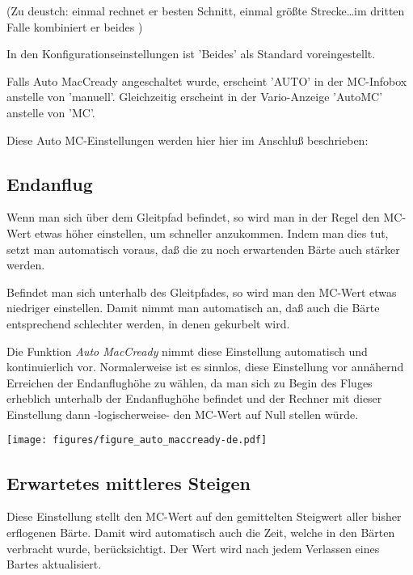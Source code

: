 (Zu deustch: einmal rechnet er besten Schnitt, einmal größte Strecke\dots im
dritten Falle kombiniert er beides )

In den Konfigurationseinstellungen ist  'Beides' als Standard voreingestellt.

Falls Auto MacCready angeschaltet wurde, erscheint 'AUTO'  in der MC-Infobox
anstelle von 'manuell'. Gleichzeitig erscheint in der Vario-Anzeige 'AutoMC' anstelle von 'MC'.

Diese Auto MC-Einstellungen werden hier hier im Anschluß beschrieben:

\subsection*{Endanflug}
Wenn man sich über dem Gleitpfad befindet, so wird man in der Regel den MC-Wert etwas höher einstellen,
um schneller anzukommen. Indem man dies tut, setzt man automatisch voraus, daß die zu noch erwartenden
Bärte auch stärker werden.

Befindet man sich unterhalb des Gleitpfades, so wird man den MC-Wert etwas niedriger einstellen.
Damit nimmt man automatisch an, daß auch die Bärte entsprechend schlechter werden, in denen gekurbelt wird.

Die Funktion \textsl{Auto MacCready} nimmt diese Einstellung automatisch und kontinuierlich vor.
Normalerweise ist es sinnlos, diese Einstellung vor annähernd Erreichen der Endanflughöhe  zu wählen, da man sich
zu Begin des Fluges erheblich unterhalb der Endanflughöhe befindet und der Rechner mit dieser Einstellung dann
-logischerweise- den MC-Wert auf Null stellen würde.


\begin{maxipage}
\begin{center}
\texttt{[image: figures/figure\_auto\_maccready-de.pdf]}
\end{center}
\end{maxipage}

\subsection*{Erwartetes mittleres Steigen}

Diese Einstellung stellt den MC-Wert auf den gemittelten Steigwert aller bisher erflogenen Bärte.
Damit wird automatisch auch die Zeit, welche in den Bärten verbracht wurde, berücksichtigt.
Der Wert wird nach jedem Verlassen eines Bartes aktualisiert.

